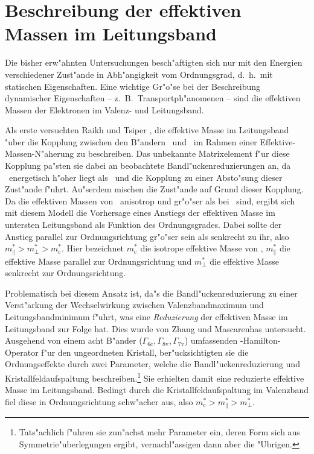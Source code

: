 \section{Beschreibung der effektiven Massen im Leitungsband}
\label{sec:k.p-m-CB}

Die bisher erw"ahnten Untersuchungen besch"aftigten sich nur mit den Energien
verschiedener Zust"ande in Abh"angigkeit vom Ordnungsgrad, d.~h.\ mit
statischen Eigenschaften. Eine wichtige Gr"o"se bei der Beschreibung
dynamischer Eigenschaften -- z.~B.\ Transportph"anomenen -- sind die
effektiven Massen der Elektronen im Valenz- und Leitungsband.

Als erste versuchten Raikh und Tsiper \cite{rats:94}, die effektive Masse im
Leitungsband "uber die Kopplung zwischen den B"andern \GCB\ und \LCB\ im
Rahmen einer Effektive-Massen-N"aherung zu beschreiben. Das unbekannte
Matrixelement f"ur diese Kopplung pa"sten sie dabei an beobachtete
Bandl"uckenreduzierungen an, da \LCB\ energetisch h"oher liegt als \GCB\ und
die Kopplung zu einer Absto"sung dieser Zust"ande f"uhrt. Au"serdem mischen
die Zust"ande auf Grund dieser Kopplung. Da die effektiven Massen von \LCB\ 
anisotrop und gr"o"ser als bei \GCB\ sind, ergibt sich mit diesem Modell die
Vorhersage eines Anstiegs der effektiven Masse im untersten Leitungsband als
Funktion des Ordnungsgrades.  Dabei sollte der Anstieg parallel zur
Ordnungsrichtung gr"o"ser sein als senkrecht zu ihr, also
$m^{\ast}_{\parallel} > m^{\ast}_{\perp} > m^{\ast}_{\text{c}}$. Hier
bezeichnet $m^{\ast}_{\text{c}}$ die isotrope effektive Masse von \GCB,
$m^{\ast}_{\parallel}$ die effektive Masse parallel zur Ordnungsrichtung und
$m^{\ast}_{\perp}$ die effektive Masse senkrecht zur Ordnungsrichtung.

Problematisch bei diesem Ansatz ist, da"s die Bandl"uckenreduzierung zu einer
Verst"arkung der Wechselwirkung zwischen Valenzbandmaximum und
Leitungsbandminimum f"uhrt, was eine \emph{Reduzierung} der effektiven Masse
im Leitungsband zur Folge hat. Dies wurde von Zhang und Mascarenhas
\cite{zhma:95} untersucht. Ausgehend von einem acht B"ander
($\Gamma_{\text{6c}}, \Gamma_{\text{8v}}, \Gamma_{\text{7v}}$) umfassenden
\kdotp-Hamilton-Operator f"ur den ungeordneten Kristall, ber"ucksichtigten sie
die Ordnungseffekte durch zwei Parameter, welche die Bandl"uckenreduzierung
und Kristallfeldaufspaltung beschreiben.\footnote{Tats"achlich f"uhren sie
  zun"achst mehr Parameter ein, deren Form sich aus Symmetrie"uberlegungen
  ergibt, vernachl"assigen dann aber die "Ubrigen.}  Sie erhielten damit eine
reduzierte effektive Masse im Leitungsband. Bedingt durch die
Kristallfeldaufspaltung im Valenzband fiel diese in Ordnungsrichtung
schw"acher aus, also $m^{\ast}_{\text{c}} > m^{\ast}_{\parallel} >
m^{\ast}_{\perp}$.

